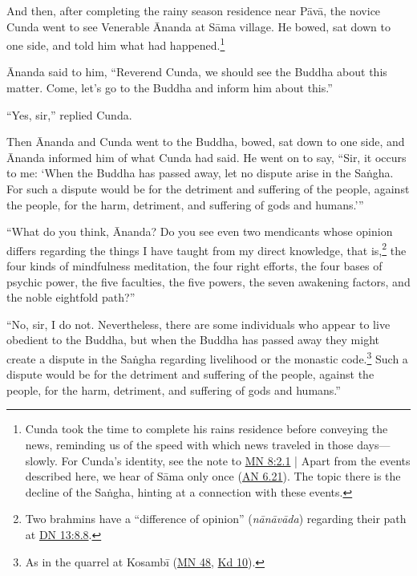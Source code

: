 \documentclass[12pt,openany]{book}%
\begin{document}
And then, after completing the rainy season residence near \textsanskrit{Pāvā}, the novice Cunda went to see Venerable Ānanda at \textsanskrit{Sāma} village. He bowed, sat down to one side, and told him what had happened.\footnote{Cunda took the time to complete his rains residence before conveying the news, reminding us of the speed with which news traveled in those days—slowly. For Cunda’s identity, see the note to \href{https://suttacentral.net/mn8/en/sujato\#2.1}{MN 8:2.1} | Apart from the events described here, we hear of \textsanskrit{Sāma} only once (\href{https://suttacentral.net/an6.21/en/sujato}{AN 6.21}). The topic there is the decline of the \textsanskrit{Saṅgha}, hinting at a connection with these events. } 

Ānanda said to him, “Reverend Cunda, we should see the Buddha about this matter. Come, let’s go to the Buddha and inform him about this.” 

“Yes, sir,” replied Cunda. 

Then Ānanda and Cunda went to the Buddha, bowed, sat down to one side, and Ānanda informed him of what Cunda had said. He went on to say, “Sir, it occurs to me: ‘When the Buddha has passed away, let no dispute arise in the \textsanskrit{Saṅgha}. For such a dispute would be for the detriment and suffering of the people, against the people, for the harm, detriment, and suffering of gods and humans.’” 

“What do you think, Ānanda? Do you see even two mendicants whose opinion differs regarding the things I have taught from my direct knowledge, that is,\footnote{Two brahmins have a “difference of opinion” (\textit{\textsanskrit{nānāvāda}}) regarding their path at \href{https://suttacentral.net/dn13/en/sujato\#8.8}{DN 13:8.8}. } the four kinds of mindfulness meditation, the four right efforts, the four bases of psychic power, the five faculties, the five powers, the seven awakening factors, and the noble eightfold path?” 

“No, sir, I do not. Nevertheless, there are some individuals who appear to live obedient to the Buddha, but when the Buddha has passed away they might create a dispute in the \textsanskrit{Saṅgha} regarding livelihood or the monastic code.\footnote{As in the quarrel at \textsanskrit{Kosambī} (\href{https://suttacentral.net/mn48/en/sujato}{MN 48}, \href{https://suttacentral.net/pli-tv-kd10/en/sujato}{Kd 10}). } Such a dispute would be for the detriment and suffering of the people, against the people, for the harm, detriment, and suffering of gods and humans.” 
\end{document}
